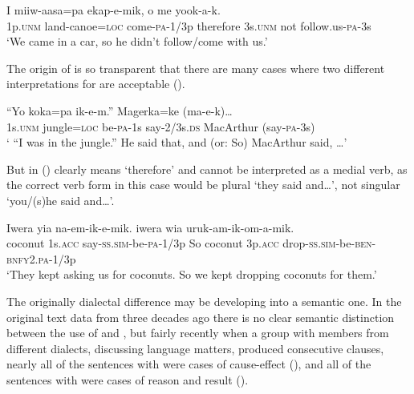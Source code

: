 \ea%
\label{ex:x1413}
\gll I miiw-aasa=pa ekap-e-mik,  o me yook-a-k.\\
1p.\textsc{unm} land-canoe=\textsc{loc} come-\textsc{pa}-1/3p therefore 3s.\textsc{unm} not follow.us-\textsc{pa}-3s\\
\glt`We came in a car, so he didn't follow/come with us.'
\z

The origin of  is so transparent that there are many cases where two different interpretations for  are acceptable (). 

\ea%
\label{ex:x734}
\gll ``Yo koka=pa ik-e-m.''  Magerka=ke (ma-e-k){\dots} \\
1s.\textsc{unm} jungle=\textsc{loc} be-\textsc{pa}-1s say-2/3s.\textsc{ds} MacArthur (say-\textsc{pa}-3s)\\
\glt` ``I was in the jungle.'' He said that, and (or: So) MacArthur said, {\dots}'
\z

But in ()  clearly means `therefore' and cannot be interpreted as a medial verb, as the correct verb form in this case would be plural  `they said and{\dots}', not singular  `you/(s)he said and{\dots}'.

\ea%
\label{ex:x733}
\gll Iwera yia na-em-ik-e-mik.  iwera wia uruk-am-ik-om-a-mik.\\
coconut 1s.\textsc{acc} say-\textsc{ss}.\textsc{sim}-be-\textsc{pa}-1/3p So coconut 3p.\textsc{acc} drop-\textsc{ss}.\textsc{sim}-be-\textsc{ben}-\textsc{bnfy}2.\textsc{pa}-1/3p\\
\glt`They kept asking us for coconuts. So we kept dropping coconuts for them.'
\z

The originally dialectal difference may be developing into a semantic one. In the original text data from three decades ago there is no clear semantic distinction between the use of  and , but fairly recently when a group with members from different dialects, discussing language matters, produced consecutive clauses, nearly all of the sentences with  were cases of cause-effect (), and all of the sentences with  were cases of reason and result (). 

